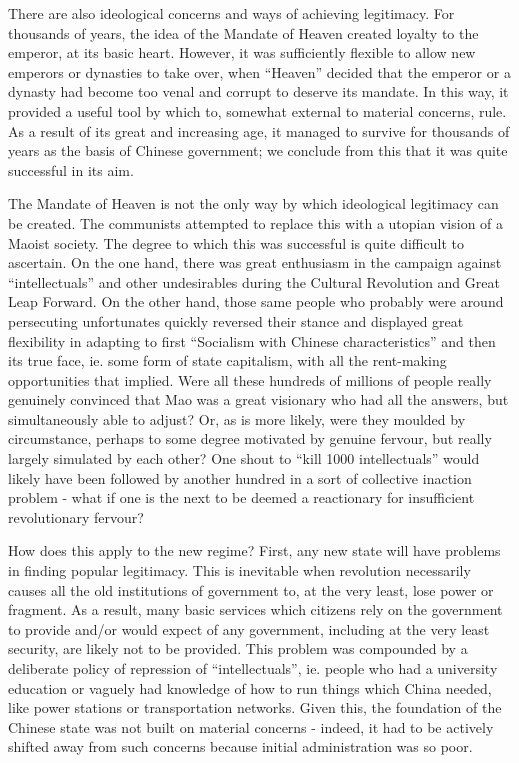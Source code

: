 \documentclass[1opt,a4paper]{article}
\begin{document}
\begin{multicols}{2}
There are also ideological concerns and ways of achieving legitimacy. For thousands of years, the idea of the Mandate of Heaven created loyalty to the emperor, at its basic heart. However, it was sufficiently flexible to allow new emperors or dynasties to take over, when ``Heaven'' decided that the emperor or a dynasty had become too venal and corrupt to deserve its mandate. In this way, it provided a useful tool by which to, somewhat external to material concerns, rule. As a result of its great and increasing age, it managed to survive for thousands of years as the basis of Chinese government; we conclude from this that it was quite successful in its aim. 

The Mandate of Heaven is not the only way by which ideological legitimacy can be created. The communists attempted to replace this with a utopian vision of a Maoist society. The degree to which this was successful is quite difficult to ascertain. On the one hand, there was great enthusiasm in the campaign against ``intellectuals'' and other undesirables during the Cultural Revolution and Great Leap Forward. On the other hand, those same people who probably were around persecuting unfortunates quickly reversed their stance and displayed great flexibility in adapting to first ``Socialism with Chinese characteristics'' and then its true face, ie. some form of state capitalism, with all the rent-making opportunities that implied. Were all these hundreds of millions of people really genuinely convinced that Mao was a great visionary who had all the answers, but simultaneously able to adjust? Or, as is more likely, were they moulded by circumstance, perhaps to some degree motivated by genuine fervour, but really largely simulated by each other? One shout to ``kill 1000 intellectuals'' would likely have been followed by another hundred in a sort of collective inaction problem - what if one is the next to be deemed a reactionary for insufficient revolutionary fervour?

How does this apply to the new regime? First, any new state will have problems in finding popular legitimacy. This is inevitable when revolution necessarily causes all the old institutions of government to, at the very least, lose power or fragment. As a result, many basic services which citizens rely on the government to provide and/or would expect of any government, including at the very least security, are likely not to be provided. This problem was compounded by a deliberate policy of repression of ``intellectuals'', ie. people who had a university education or vaguely had knowledge of how to run things which China needed, like power stations or transportation networks. Given this, the foundation of the Chinese state was not built on material concerns - indeed, it had to be actively shifted away from such concerns because initial administration was so poor.


\end{multicols}
\end{document}
